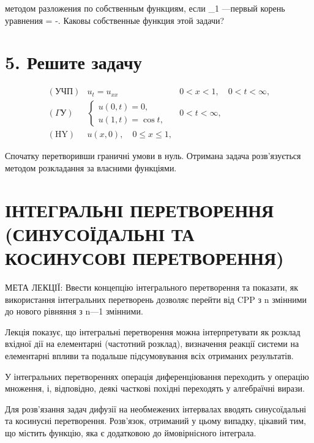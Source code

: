\documentclass[
  ukrainian,
]{article}
\begin{document}
методом разложения по собственным функциям, если \lambda\_1 ---первый
корень уравнения  \lambda = -\lambda . Каковы
собственные функция этой задачи?

\section{5. Решите
задачу}\label{ux440ux435ux448ux438ux442ux435-ux437ux430ux434ux430ux447ux443}

\[
\begin{array}{ll} (\text{УЧП}) & u_t = u_{xx} & 0 < x < 1, \quad 0 < t < \infty, \\ (\Gamma \text{У}) & \begin{cases} u(0, t) = 0, \\ u(1, t) = \cos t, \end{cases} & 0 < t < \infty, \\ (\text{HY}) & u(x, 0), \quad 0 \leqslant x \leqslant 1, \end{array}
\]

Спочатку перетворивши граничні умови в нуль. Отримана задача
розв'язується методом розкладання за власними функціями.

\section{ІНТЕГРАЛЬНІ ПЕРЕТВОРЕННЯ (СИНУСОЇДАЛЬНІ ТА КОСИНУСОВІ
ПЕРЕТВОРЕННЯ)}\label{ux456ux43dux442ux435ux433ux440ux430ux43bux44cux43dux456-ux43fux435ux440ux435ux442ux432ux43eux440ux435ux43dux43dux44f-ux441ux438ux43dux443ux441ux43eux457ux434ux430ux43bux44cux43dux456-ux442ux430-ux43aux43eux441ux438ux43dux443ux441ux43eux432ux456-ux43fux435ux440ux435ux442ux432ux43eux440ux435ux43dux43dux44f}

МЕТА ЛЕКЦІЇ: Ввести концепцію інтегрального перетворення та показати, як
використання інтегральних перетворень дозволяє перейти від CPP з n
змінними до нового рівняння з n---1 змінними.

Лекція показує, що інтегральні перетворення можна інтерпретувати як
розклад вхідної дії на елементарні (частотний розклад), визначення
реакції системи на елементарні впливи та подальше підсумовування всіх
отриманих результатів.

У інтегральних перетвореннях операція диференціювання переходить у
операцію множення, і, відповідно, деякі часткові похідні переходять у
алгебраїчні вирази.

Для розв'язання задач дифузії на необмежених інтервалах вводять
синусоїдальні та косинусні перетворення. Розв'язок, отриманий у цьому
випадку, цікавий тим, що містить функцію, яка є додатковою до
ймовірнісного інтеграла.
\end{document}
